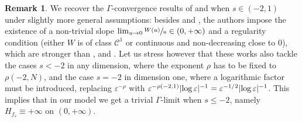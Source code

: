 \documentclass[10pt]{amsart}
\theoremstyle{plain}
\theoremstyle{definition}
\newtheorem{remark}[theorem]{Remark}
\newcommand{\Cspace}{\mathscr{C}}
\newcommand{\eps}{\varepsilon}
\DeclarePairedDelimiter{\abs}{\lvert}{\rvert}
\begin{document}
\begin{remark}
We recover the $\Gamma$-convergence results of \cite{bouchitteTransitionsPhasesAvec1996} and \cite{dubsProblemesPerturbationsSingulieres1998} when $s \in (-2,1)$ under slightly more general assumptions: besides  and , the authors impose the existence of a non-trivial slope $\lim_{u\to 0} \sfrac{W(u)}u \in (0,+\infty)$ and a regularity condition (either $W$ is of class $\Cspace^1$ or continuous and non-decreasing close to $0$), which are stronger than ,  and . Let us stress however that these works also tackle the cases $s < -2$ in any dimension, where the exponent $\rho$ has to be fixed to $\rho(-2,N)$, and the case $s=-2$ in dimension one, where a logarithmic factor must be introduced, replacing $\eps^{-\rho}$ with $\eps^{-\rho(-2,1)} \abs{\log\eps}^{-1} = \eps^{-1/2} \abs{\log \eps}^{-1}$. This implies that in our model we get a trivial $\Gamma$-limit when $s \leq -2$, namely $H_{f_s} \equiv +\infty$ on $(0,+\infty)$.
\end{remark}
\end{document}
